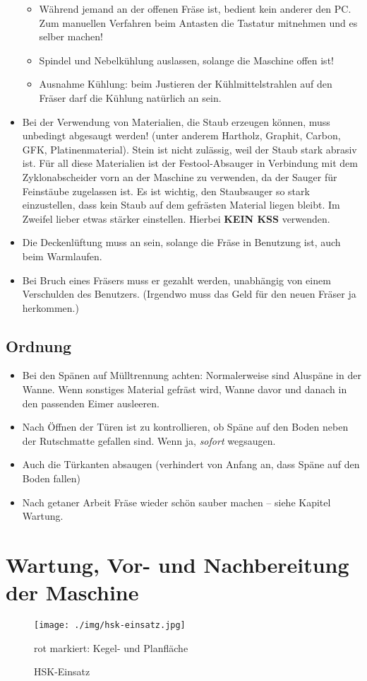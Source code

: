 \documentclass{\basedir/fablab-document}
\begin{document}
\begin{itemize}
\begin{itemize}
	\item Während jemand an der offenen Fräse ist, bedient kein anderer den PC. Zum manuellen Verfahren beim Antasten die Tastatur mitnehmen und es selber machen!
	\item Spindel und Nebelkühlung auslassen, solange die Maschine offen ist!
	\item Ausnahme Kühlung: beim Justieren der Kühlmittelstrahlen auf den Fräser darf die Kühlung natürlich an sein.
\end{itemize}
	\item Bei der Verwendung von Materialien, die Staub erzeugen können, muss unbedingt abgesaugt werden! (unter anderem Hartholz, Graphit, Carbon, GFK, Platinenmaterial). Stein ist nicht zulässig, weil der Staub stark abrasiv ist. Für all diese Materialien ist der Festool-Absauger in Verbindung mit dem Zyklonabscheider vorn an der Maschine zu verwenden, da der Sauger für Feinstäube zugelassen ist. Es ist wichtig, den Staubsauger so stark einzustellen, dass kein Staub auf dem gefrästen Material liegen bleibt. Im Zweifel lieber etwas stärker einstellen. Hierbei \textbf{KEIN KSS} verwenden.
	\item Die Deckenlüftung muss an sein, solange die Fräse in Benutzung ist, auch beim Warmlaufen.
	\item Bei Bruch eines Fräsers muss er gezahlt werden, unabhängig von einem Verschulden des Benutzers. (Irgendwo muss das Geld für den neuen Fräser ja herkommen.)
\end{itemize}
\subsection{Ordnung} \label{ordnung}
\begin{itemize}
	\item Bei den Spänen auf Mülltrennung achten: Normalerweise sind Aluspäne in der Wanne. Wenn sonstiges Material gefräst wird, Wanne davor und danach in den passenden Eimer ausleeren.
	\item Nach Öffnen der Türen ist zu kontrollieren, ob Späne auf den Boden neben der Rutschmatte gefallen sind. Wenn ja, \emph{sofort} wegsaugen.
	\item Auch die Türkanten absaugen (verhindert von Anfang an, dass Späne auf den Boden fallen)
	\item Nach getaner Arbeit Fräse wieder schön sauber machen -- siehe Kapitel Wartung.
\end{itemize}

\clearpage
\section{Wartung, Vor- und Nachbereitung der Maschine}
\begin{wrapfigure}{r}{6.5cm}
\centering
\texttt{[image: ./img/hsk-einsatz.jpg]}
\caption{HSK-Einsatz}
rot markiert: Kegel- und Planfläche
\label{fig:hsk-einsatz}
\end{wrapfigure}
\end{document}
